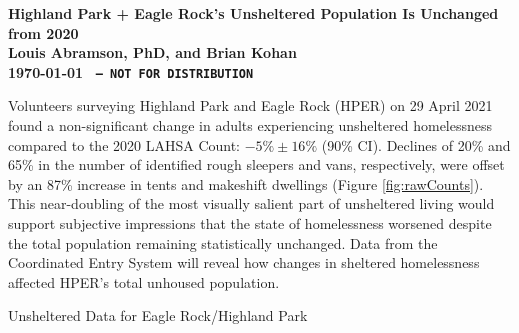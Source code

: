 \documentclass[11pt]{article}
\def\bfr{\bf\color{red}}
\def\resp{respectively}
\begin{document}

\begin{center}
	\Large\bf Highland Park + Eagle Rock's Unsheltered Population Is Unchanged from 2020\\
	\vspace{1ex}
	{\normalsize\rm Louis Abramson, PhD, and Brian Kohan\\ \today 
	}{\bfr \texttt{ -- NOT FOR DISTRIBUTION}}
\end{center}

 Volunteers surveying  Highland Park and Eagle Rock (HPER) on 29 April 2021 
found  a non-significant change in adults experiencing unsheltered homelessness compared to the 2020 
LAHSA Count: $-5\%\pm16\%$ (90\% CI). Declines of 20\% and 65\% in the number of identified rough 
sleepers and vans, \resp, were offset by an 87\% increase in tents and makeshift dwellings 
(Figure \ref{fig:rawCounts}). This near-doubling of the most visually salient part of unsheltered 
living would support subjective impressions that the state of homelessness worsened despite the 
total population remaining statistically unchanged. Data from the Coordinated Entry System will 
reveal how changes in sheltered homelessness affected HPER's total unhoused 
population.

\begin{table}[h]
\caption{Unsheltered Data for Eagle Rock/Highland Park}
\caption*{*Neither the raw counts nor inferred population change is statistically significant 
(parentheses denote 90\% uncertainties). No minors or families were sighted; two transition aged youth
tallied as ``Persons.''}
\label{tbl:summary}
\end{table}
\end{document}
